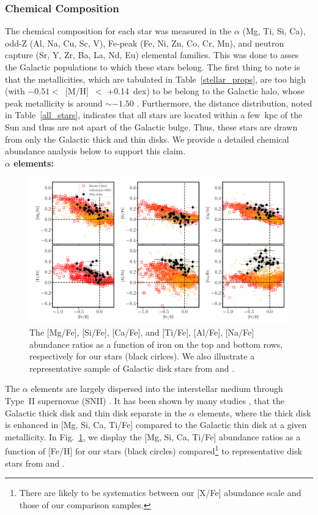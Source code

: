 \documentclass[a4paper,fleqn,usenatbib]{mnras}
\begin{document}
\subsubsection{Chemical Composition}
\label{chemical}
The chemical composition for each star was measured in the $\alpha$ (Mg, Ti, Si, Ca), odd-Z (Al, Na, Cu, Sc, V), Fe-peak (Fe, Ni, Zn, Co, Cr, Mn), and neutron capture (Sr, Y, Zr, Ba, La, Nd, Eu) elemental families. This was done to asses the Galactic populations to which these stars belong. The first thing to note is that the metallicities, which are tabulated in Table~\ref{stellar_props}, are too high (with $-0.51<$~[M/H]~$<$ +0.14~dex) to be belong to the Galactic halo, whose peak metallicity is around $\sim -1.50$ \cite[e.g.][]{Chiba2000}. Furthermore, the distance distribution, noted in Table~\ref{all_stars}, indicates that all stars are located within a few~kpc of the Sun and thus are not apart of the Galactic bulge. Thus, these stars are drawn from only the Galactic thick and thin disks. We provide a detailed chemical abundance analysis below to support this claim.\\
{\bf $\alpha$ elements:}\\
\begin{figure}
\noindent\includegraphics[width=\textwidth,keepaspectratio]{Pope_spectra_alphaele.pdf}

\caption{\label{alphael}
The [Mg/Fe], [Si/Fe], [Ca/Fe], and [Ti/Fe], [Al/Fe], [Na/Fe] abundance ratios as a function of iron on the top and bottom rows, respectively for our stars (black cirlces). We also illustrate a representative sample of Galactic disk stars from \citet[open red square,][]{Bensby2014} and \citet[open orange triangles,][]{Adibekyan2012}. } 
\end{figure}
The $\alpha$ elements are largely dispersed into the interstellar medium through Type~II supernovae (SNII) \citep{Matteucci2001}. It has been shown by many studies \citep[e.g.][and references therein]{Edvardsson1993, Adibekyan2012, Feltzing2013, Bensby2014}, that the Galactic thick disk and thin disk separate in the $\alpha$ elements, where the thick disk is enhanced in [Mg, Si, Ca, Ti/Fe] compared to the Galactic thin disk at a given metallicity. In Fig.~\ref{alphael}, we display the [Mg, Si, Ca, Ti/Fe] abundance ratios as a function of [Fe/H] for our stars (black circles) compared\footnote{There are likely to be systematics between our [X/Fe] abundance scale and those of our comparison samples.}  to representative disk stars from \cite[open red square]{Bensby2014} and \cite[open orange triangles]{Adibekyan2012}. 
\end{document}
